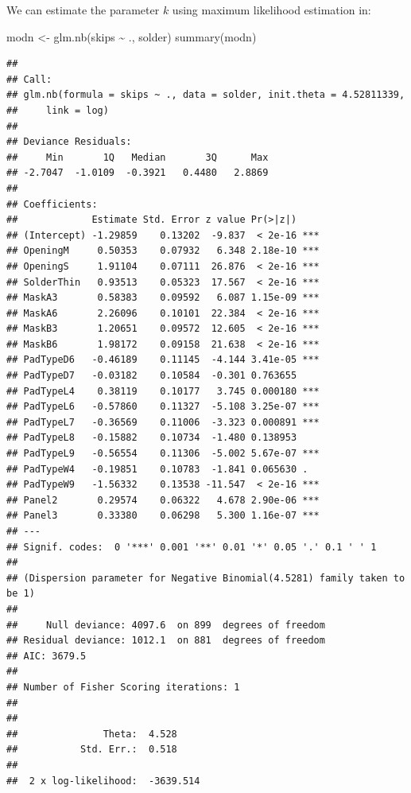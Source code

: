 \documentclass[
  ignorenonframetext,
]{beamer}
\newenvironment{Shaded}{\begin{snugshade}}{\end{snugshade}}
\newcommand{\FunctionTok}[1]{\textcolor[rgb]{0.00,0.00,0.00}{#1}}
\newcommand{\NormalTok}[1]{#1}
\newcommand{\OtherTok}[1]{\textcolor[rgb]{0.56,0.35,0.01}{#1}}
\newcommand{\SpecialCharTok}[1]{\textcolor[rgb]{0.00,0.00,0.00}{#1}}
\begin{document}
\begin{frame}[fragile]{}
\protect\hypertarget{section-34}{}
We can estimate the parameter \(k\) using maximum likelihood estimation
in:

\tiny

\begin{Shaded}
\begin{Highlighting}[]
\NormalTok{modn }\OtherTok{\textless{}{-}} \FunctionTok{glm.nb}\NormalTok{(skips }\SpecialCharTok{\textasciitilde{}}\NormalTok{ ., solder)}
\FunctionTok{summary}\NormalTok{(modn)}
\end{Highlighting}
\end{Shaded}

\begin{verbatim}
## 
## Call:
## glm.nb(formula = skips ~ ., data = solder, init.theta = 4.52811339, 
##     link = log)
## 
## Deviance Residuals: 
##     Min       1Q   Median       3Q      Max  
## -2.7047  -1.0109  -0.3921   0.4480   2.8869  
## 
## Coefficients:
##             Estimate Std. Error z value Pr(>|z|)    
## (Intercept) -1.29859    0.13202  -9.837  < 2e-16 ***
## OpeningM     0.50353    0.07932   6.348 2.18e-10 ***
## OpeningS     1.91104    0.07111  26.876  < 2e-16 ***
## SolderThin   0.93513    0.05323  17.567  < 2e-16 ***
## MaskA3       0.58383    0.09592   6.087 1.15e-09 ***
## MaskA6       2.26096    0.10101  22.384  < 2e-16 ***
## MaskB3       1.20651    0.09572  12.605  < 2e-16 ***
## MaskB6       1.98172    0.09158  21.638  < 2e-16 ***
## PadTypeD6   -0.46189    0.11145  -4.144 3.41e-05 ***
## PadTypeD7   -0.03182    0.10584  -0.301 0.763655    
## PadTypeL4    0.38119    0.10177   3.745 0.000180 ***
## PadTypeL6   -0.57860    0.11327  -5.108 3.25e-07 ***
## PadTypeL7   -0.36569    0.11006  -3.323 0.000891 ***
## PadTypeL8   -0.15882    0.10734  -1.480 0.138953    
## PadTypeL9   -0.56554    0.11306  -5.002 5.67e-07 ***
## PadTypeW4   -0.19851    0.10783  -1.841 0.065630 .  
## PadTypeW9   -1.56332    0.13538 -11.547  < 2e-16 ***
## Panel2       0.29574    0.06322   4.678 2.90e-06 ***
## Panel3       0.33380    0.06298   5.300 1.16e-07 ***
## ---
## Signif. codes:  0 '***' 0.001 '**' 0.01 '*' 0.05 '.' 0.1 ' ' 1
## 
## (Dispersion parameter for Negative Binomial(4.5281) family taken to be 1)
## 
##     Null deviance: 4097.6  on 899  degrees of freedom
## Residual deviance: 1012.1  on 881  degrees of freedom
## AIC: 3679.5
## 
## Number of Fisher Scoring iterations: 1
## 
## 
##               Theta:  4.528 
##           Std. Err.:  0.518 
## 
##  2 x log-likelihood:  -3639.514
\end{verbatim}
\end{frame}
\end{document}
